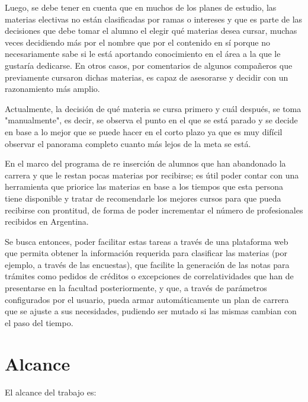 \documentclass[a4paper]{article}
\begin{document}
Luego, se debe tener en cuenta que en muchos de los planes de estudio, las materias electivas no están clasificadas por ramas o intereses y que es parte de las decisiones que debe tomar el alumno el elegir qué materias desea cursar, muchas veces decidiendo más por el nombre que por el contenido en sí porque no necesariamente sabe si le está aportando conocimiento en el área a la que le gustaría dedicarse. En otros casos, por comentarios de algunos compañeros que previamente cursaron dichas materias, es capaz de asesorarse y decidir con un razonamiento más amplio.

Actualmente, la decisión de qué materia se cursa primero y cuál después, se toma "manualmente", es decir, se observa el punto en el que se está parado y se decide en base a lo mejor que se puede hacer en el corto plazo ya que es muy difícil observar el panorama completo cuanto más lejos de la meta se está.

En el marco del programa de re inserción de alumnos que han abandonado la carrera y que le restan pocas materias por recibirse; es útil poder contar con una herramienta que priorice las materias en base a los tiempos que esta persona tiene disponible y tratar de recomendarle los mejores cursos para que pueda recibirse con prontitud, de forma de poder incrementar el número de profesionales recibidos en Argentina.

Se busca entonces, poder facilitar estas tareas a través de una plataforma web que permita obtener la información requerida para clasificar las materias (por ejemplo, a través de las encuestas), que facilite la generación de las notas para trámites como pedidos de créditos o excepciones de correlatividades que han de presentarse en la facultad posteriormente, y que, a través de parámetros configurados por el usuario, pueda armar automáticamente un plan de carrera que se ajuste a sus necesidades, pudiendo ser mutado si las mismas cambian con el paso del tiempo.

\section{Alcance}

El alcance del trabajo es:
\end{document}
